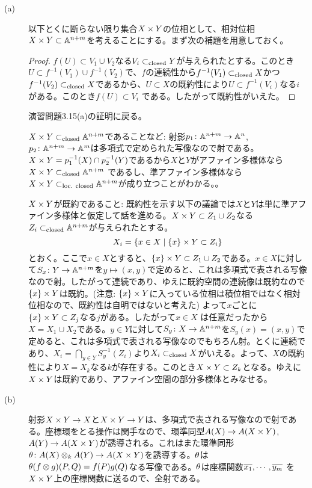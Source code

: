 \begin{description}
  \item[(a)] 以下とくに断らない限り集合$X \times Y$の位相として、相対位相$X \times Y \subset {\mathbb A}^{n+m}$を考えることにする。まず次の補題を用意しておく。

  \begin{proof}
    $f(U) \subset V_1 \cup V_2$なる$V_i \subset_{\text{closed}} Y$が与えられたとする。このとき$U \subset f^{-1}(V_1) \cup f^{-1}(V_2)$で、$f$の連続性から$f^{-1}(V_1) \subset_{\text{closed}} X$かつ$f^{-1}(V_2) \subset_{\text{closed}} X$であるから、$U \subset X$の既約性により$U \subset f^{-1}(V_i) $なる$i$がある。このとき$f(U) \subset V_i$
    である。したがって既約性がいえた。
  \end{proof}

  演習問題3.15(a)の証明に戻る。

  $X \times Y \subset_{\text{closed}} {\mathbb A}^{n+m}$であることなど: 射影$p_1 \colon {\mathbb A}^{n+m} \to {\mathbb A}^n$, $p_2 \colon {\mathbb A}^{n+m} \to {\mathbb A}^m$は多項式で定められた写像なので射である。$X \times Y = p_1^{-1}(X) \cap p_2^{-1}(Y)$であるから$X$と$Y$がアファイン多様体なら$X \times Y \subset_{\text{closed}} {\mathbb A}^{n+m}$
  であるし、準アファイン多様体なら$X \times Y \subset_{\text{loc. closed}} {\mathbb A}^{n+m}$が成り立つことがわかる。。

  $X \times Y$が既約であること: 既約性を示す以下の議論では$X$と$Y$は単に準アファイン多様体と仮定して話を進める。$X \times Y \subset Z_1 \cup Z_2$なる$Z_i \subset_{\text{closed}} {\mathbb A}^{n+m}$が与えられたとする。
  \[
  X_i = \left\{ x \in X \mathrel{} \middle| \mathrel{} \{ x \} \times Y \subset Z_i \right\}
  \]
  とおく。ここで$x \in X$とすると、$\{ x \} \times Y \subset Z_1 \cup Z_2$である。$x \in X$に対して$S_x \colon Y \to {\mathbb A}^{n+m}$を$y \mapsto (x,y)$で定めると、これは多項式で表される写像なので射。したがって連続であり、ゆえに既約空間の連続像は既約なので$\{ x \} \times Y$は既約。(注意: $\{ x \} \times Y$に入っている位相は積位相ではなく相対位相なので、既約性は自明ではないと考えた) よって$x$ごとに$\{ x \} \times Y \subset Z_j$なる$j$がある。したがって$x \in X$
  は任意だったから$X = X_1 \cup X_2$である。$y \in Y$に対して$S_y \colon X \to {\mathbb A}^{n+m}$を$S_y(x)=(x,y)$で定めると、これは多項式で表される写像なのでもちろん射。とくに連続であり、$X_i = \bigcap_{y \in Y} S_y^{-1}(Z_i)$より$X_i \subset_{\text{closed}} X$がいえる。よって、$X$の既約性により$X = X_k$なる$k$が存在する。このとき$X \times Y \subset Z_k$となる。ゆえに$X \times Y$は既約であり、アファイン空間の部分多様体とみなせる。
  \item[(b)] 射影$X \times Y \to X$と$X \times Y \to Y$は、多項式で表される写像なので射である。座標環をとる操作は関手なので、環準同型$A(X) \to A(X \times Y)$, $A(Y) \to A(X \times Y)$が誘導される。これはまた環準同形${\theta} \colon A(X) \otimes_k A(Y) \to A(X \times Y)$を誘導する。${\theta}$は${\theta}(f \otimes g)(P,Q) = f(P)g(Q)$なる写像である。${\theta}$は座標関数$\overline{x_1}, \cdots , \overline{y_m}$
  を$X \times Y$上の座標関数に送るので、全射である。


\end{description}
